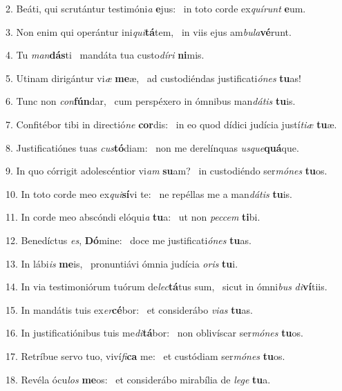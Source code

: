 2. Beáti, qui scrutántur testimóni\textit{a} \textbf{e}jus: \ast\  in toto corde ex\textit{quí}\textit{runt} \textbf{e}um.\

3. Non enim qui operántur ini\textit{qui}\textbf{tá}tem, \ast\  in viis ejus am\textit{bu}\textit{la}\textbf{vé}runt.\

4. Tu \textit{man}\textbf{dás}ti \ast\  mandáta tua custo\textit{dí}\textit{ri} \textbf{ni}mis.\

5. Utinam dirigántur vi\textit{æ} \textbf{me}æ, \ast\  ad custodiéndas justificati\textit{ó}\textit{nes} \textbf{tu}as!\

6. Tunc non \textit{con}\textbf{fún}dar, \ast\  cum perspéxero in ómnibus man\textit{dá}\textit{tis} \textbf{tu}is.\

7. Confitébor tibi in directió\textit{ne} \textbf{cor}dis: \ast\  in eo quod dídici judícia justí\textit{ti}\textit{æ} \textbf{tu}æ.\

8. Justificatiónes tuas \textit{cus}\textbf{tó}diam: \ast\  non me derelínquas \textit{us}\textit{que}\textbf{quá}que.\

9. In quo córrigit adolescéntior vi\textit{am} \textbf{su}am? \ast\  in custodiéndo ser\textit{mó}\textit{nes} \textbf{tu}os.\

10. In toto corde meo ex\textit{qui}\textbf{sí}vi te: \ast\  ne repéllas me a man\textit{dá}\textit{tis} \textbf{tu}is.\

11. In corde meo abscóndi elóqui\textit{a} \textbf{tu}a: \ast\  ut non \textit{pec}\textit{cem} \textbf{ti}bi.\

12. Benedíctus \textit{es}, \textbf{Dó}mine: \ast\  doce me justificati\textit{ó}\textit{nes} \textbf{tu}as.\

13. In lábi\textit{is} \textbf{me}is, \ast\  pronuntiávi ómnia judícia \textit{o}\textit{ris} \textbf{tu}i.\

14. In via testimoniórum tuórum de\textit{lec}\textbf{tá}tus sum, \ast\  sicut in ómni\textit{bus} \textit{di}\textbf{ví}tiis.\

15. In mandátis tuis ex\textit{er}\textbf{cé}bor: \ast\  et considerábo \textit{vi}\textit{as} \textbf{tu}as.\

16. In justificatiónibus tuis me\textit{di}\textbf{tá}bor: \ast\  non oblivíscar ser\textit{mó}\textit{nes} \textbf{tu}os.\

17. Retríbue servo tuo, viví\textit{fi}\textbf{ca} me: \ast\  et custódiam ser\textit{mó}\textit{nes} \textbf{tu}os.\

18. Revéla ócu\textit{los} \textbf{me}os: \ast\  et considerábo mirabília de \textit{le}\textit{ge} \textbf{tu}a.\

